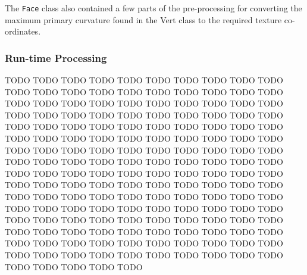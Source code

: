       The \texttt{Face} class also contained a few parts of the pre-processing
      for converting the maximum primary curvature found in the Vert class to
      the required texture co-ordinates.


    \subsubsection{Run-time Processing}

      TODO TODO TODO TODO TODO TODO TODO TODO TODO TODO TODO TODO TODO TODO TODO
      TODO TODO TODO TODO TODO TODO TODO TODO TODO TODO TODO TODO TODO TODO TODO
      TODO TODO TODO TODO TODO TODO TODO TODO TODO TODO TODO TODO TODO TODO TODO
      TODO TODO TODO TODO TODO TODO TODO TODO TODO TODO TODO TODO TODO TODO TODO
      TODO TODO TODO TODO TODO TODO TODO TODO TODO TODO TODO TODO TODO TODO TODO
      TODO TODO TODO TODO TODO TODO TODO TODO TODO TODO TODO TODO TODO TODO TODO
      TODO TODO TODO TODO TODO TODO TODO TODO TODO TODO TODO TODO TODO TODO TODO
      TODO TODO TODO TODO TODO TODO TODO TODO TODO TODO TODO TODO TODO TODO TODO
      TODO TODO TODO TODO TODO TODO TODO TODO TODO TODO TODO TODO TODO TODO TODO
      TODO TODO TODO TODO TODO TODO TODO TODO TODO TODO TODO TODO TODO TODO TODO
      TODO TODO TODO TODO TODO TODO TODO TODO TODO TODO TODO TODO TODO TODO TODO
